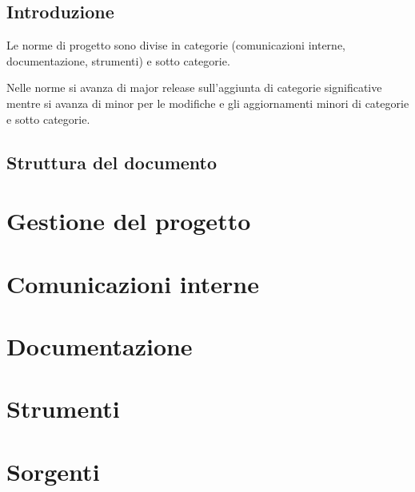 \documentclass[a4paper, 12pt]{report}
\begin{document}
\tableofcontents

\newpage

\section{Introduzione}
Le norme di progetto sono divise in categorie (comunicazioni interne, documentazione, strumenti) e sotto categorie.

Nelle norme si avanza di major release sull'aggiunta di categorie significative mentre si avanza di minor per le modifiche e gli aggiornamenti minori di categorie e sotto categorie.

\section{Struttura del documento}

\chapter{Gestione del progetto}


\chapter{Comunicazioni interne}


\chapter{Documentazione}





\chapter{Strumenti}






\chapter{Sorgenti}


\end{document}
